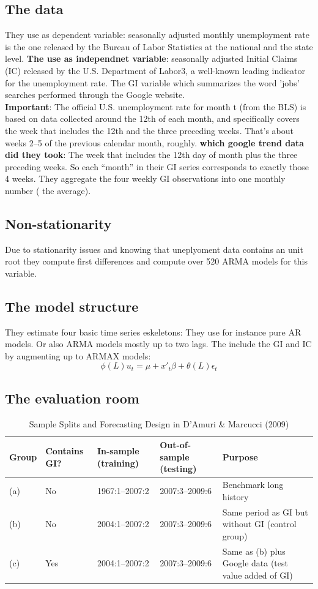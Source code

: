 \documentclass{article}
\begin{document}
\subsection{The data}
They use as dependent variable: seasonally adjusted monthly
unemployment rate is the one released by the Bureau of Labor Statistics at the national and the state level.
\textbf{The use as independnet variable}: seasonally adjusted Initial Claims (IC) released by the U.S.
Department of Labor3, a well-known leading indicator for the unemployment rate. The GI variable which summarizes the word 'jobs' searches performed through the Google website.
\\
\textbf{Important}: The official U.S. unemployment rate for month 
t (from the BLS) is based on data collected around the 12th of each month, and specifically covers the week that includes the 12th and the three preceding weeks. That’s about weeks 2–5 of the previous calendar month, roughly.
\textbf{which google trend data did they took}: The week that includes the 12th day of month plus the three preceding weeks.
So each “month” in their GI series corresponds to exactly those 4 weeks. They aggregate the four weekly GI observations into one monthly number ( the average). 

\subsection{Non-stationarity}
Due to stationarity issues and knowing that uneplyoment data contains an unit root they compute first differences and compute over 520 ARMA models for this variable.

\subsection{The model structure}
They estimate four basic time series eskeletons: They use for instance pure AR models. Or also ARMA models mostly up to two lags. 
The include the GI and IC by augmenting up to ARMAX models:
$$\phi(L)u_t = \mu + x'_{t} \beta + \theta(L)\epsilon_t$$

\subsection{The evaluation room}
\begin{table}[H]
\centering
\caption{Sample Splits and Forecasting Design in D'Amuri \& Marcucci (2009)}
\begin{tabular}{@{}lllll@{}}
\toprule
\textbf{Group} & \textbf{Contains GI?} & \textbf{In-sample (training)} & \textbf{Out-of-sample (testing)} & \textbf{Purpose} \\ \midrule
(a) & No  & 1967:1--2007:2 & 2007:3--2009:6 & Benchmark long history \\[3pt]
(b) & No  & 2004:1--2007:2 & 2007:3--2009:6 & Same period as GI but without GI (control group) \\[3pt]
(c) & Yes & 2004:1--2007:2 & 2007:3--2009:6 & Same as (b) plus Google data (test value added of GI) \\ \bottomrule
\end{tabular}
\end{table}
\end{document}
